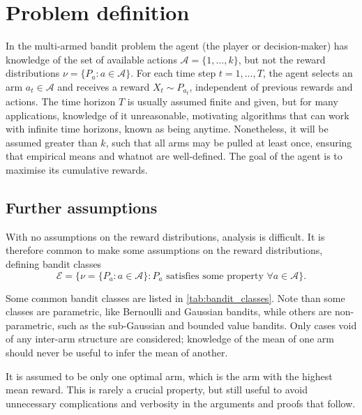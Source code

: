 \section{Problem definition}
In the multi-armed bandit problem the agent (the player or decision-maker) has knowledge of the set of available actions $\mathcal{A}=\{1, \dots, k\}$, but not the reward distributions $\nu = \{P_a : a \in \mathcal{A}\}$.
For each time step $t=1, \dots, T$, the agent selects an arm $a_t \in \mathcal{A}$ and receives a reward $X_t \sim P_{a_t}$, independent of previous rewards and actions.
The time horizon $T$ is usually assumed finite and given, but for many applications, knowledge of it unreasonable, motivating algorithms that can work with infinite time horizons, known as being anytime.
Nonetheless, it will be assumed greater than $k$, such that all arms may be pulled at least once, ensuring that empirical means and whatnot are well-defined.
The goal of the agent is to maximise its cumulative rewards.

\subsection{Further assumptions}
With no assumptions on the reward distributions, analysis is difficult.
It is therefore common to make some assumptions on the reward distributions, defining bandit classes
\begin{equation}
    \mathcal{E} = \{\nu = \{P_a : a \in \mathcal{A}\} : P_a \text{ satisfies some property } \forall a \in \mathcal{A}\}.
\end{equation}

Some common bandit classes are listed in \cref{tab:bandit_classes}.
Note than some classes are parametric, like Bernoulli and Gaussian bandits, while others are non-parametric, such as the sub-Gaussian and bounded value bandits.
Only cases void of any inter-arm structure are considered; knowledge of the mean of one arm should never be useful to infer the mean of another.

It is assumed to be only one optimal arm, which is the arm with the highest mean reward.
This is rarely a crucial property, but still useful to avoid unnecessary complications and verbosity in the arguments and proofs that follow.


